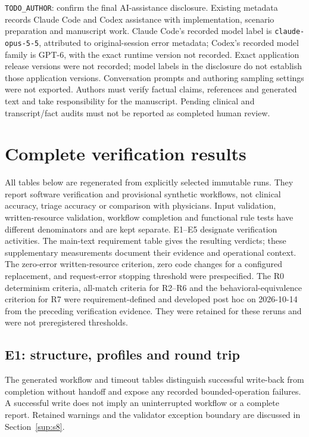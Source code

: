\texttt{TODO\_AUTHOR}: confirm the final AI-assistance disclosure. Existing
metadata records Claude Code and Codex assistance with implementation, scenario
preparation and manuscript work. Claude Code's recorded model label is
\texttt{claude-opus-5-5}, attributed to original-session error metadata; Codex's
recorded model family is GPT-6, with the exact runtime version not recorded.
Exact application release versions were not recorded;
model labels in the disclosure do not establish those application versions.
Conversation prompts and authoring sampling settings were not exported. Authors
must verify factual claims, references and generated text and take responsibility
for the manuscript. Pending clinical and transcript/fact audits must not be
reported as completed human review.

\section{Complete verification results}\label{sup:s6}
All tables below are regenerated from explicitly selected immutable runs. They
report software verification and provisional synthetic workflows, not clinical
accuracy, triage accuracy or comparison with physicians. Input validation,
written-resource validation, workflow completion and functional rule tests have
different denominators and are kept separate.
E1--E5 designate verification activities. The main-text requirement table gives
the resulting verdicts; these supplementary measurements document their evidence
and operational context. The zero-error written-resource criterion, zero code
changes for a configured replacement, and request-error stopping threshold were
prespecified. The R0 determinism criteria, all-match criteria for R2--R6 and the behavioral-equivalence
criterion for R7 were requirement-defined and developed post hoc on 2026-10-14
from the preceding verification evidence. They were retained for these reruns
and were not preregistered thresholds.

\subsection{E1: structure, profiles and round trip}





The generated workflow and timeout tables distinguish successful write-back
from completion without handoff and expose any recorded bounded-operation
failures. A successful write does not imply an uninterrupted workflow or a
complete report. Retained warnings and the validator exception boundary are
discussed in Section~\ref{sup:s8}.

